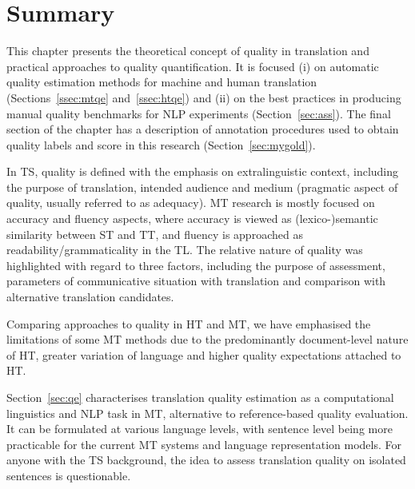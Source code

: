 \section{\label{sec:sum4}Summary}

This chapter presents the theoretical concept of quality in translation and practical approaches to quality quantification. 
It is focused (i) on automatic quality estimation methods for machine and human translation (Sections~\ref{ssec:mtqe} and~\ref{ssec:htqe}) and (ii) on the best practices in producing manual quality benchmarks for NLP experiments (Section~\ref{sec:ass}). The final section of the chapter has a description of annotation procedures used to obtain quality labels and score in this research (Section~\ref{sec:mygold}).

In \gls{TS}, quality is defined with the emphasis on extralinguistic context, including the purpose of translation, intended audience and medium (pragmatic aspect of quality, usually referred to as adequacy). MT research is mostly focused on accuracy and fluency aspects, where accuracy is viewed as (lexico-)semantic similarity between ST and TT, and fluency is approached as readability/grammaticality in the TL. The relative nature of quality was highlighted with regard to three factors, including the purpose of assessment, parameters of communicative situation with translation and comparison with alternative translation candidates. 

Comparing approaches to quality in HT and MT, we have emphasised the limitations of some MT methods due to the predominantly document-level nature of HT, greater variation of language and higher quality expectations attached to HT.

Section~\ref{sec:qe} characterises translation quality estimation as a computational linguistics and NLP task in MT, alternative to reference-based quality evaluation. It can be formulated at various language levels, with sentence level being more practicable for the current MT systems and language representation models. For anyone with the TS background, the idea to assess translation quality on isolated sentences is questionable. 

